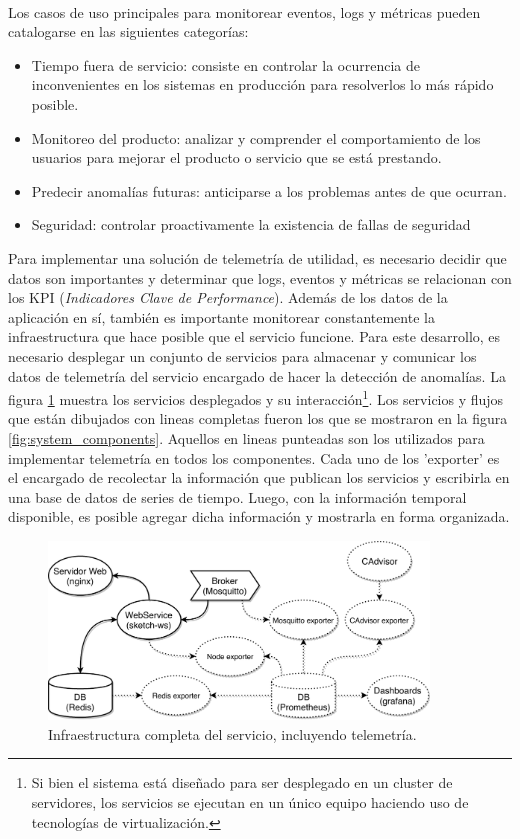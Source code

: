 \documentclass[a4paper,12pt, oneside]{article}
\begin{document}
\

Los casos de uso principales para monitorear eventos, logs y métricas pueden catalogarse en las siguientes categorías:
\begin{itemize}
	\item Tiempo fuera de servicio: consiste en controlar la ocurrencia de inconvenientes en los sistemas en producción para resolverlos lo más rápido posible.
	\item Monitoreo del producto: analizar y comprender el comportamiento de los usuarios para mejorar el producto o servicio que se está prestando.
	\item Predecir anomalías futuras: anticiparse a los problemas antes de que ocurran.
	\item Seguridad: controlar proactivamente la existencia de fallas de seguridad
\end{itemize}

Para implementar una solución de telemetría de utilidad, es necesario decidir que datos son importantes y determinar que logs, eventos y métricas se relacionan con los KPI (\textit{Indicadores Clave de Performance}). Además de los datos de la aplicación en sí, también es importante monitorear constantemente la infraestructura que hace posible que el servicio funcione. Para este desarrollo, es necesario desplegar un conjunto de servicios para almacenar y comunicar los datos de telemetría del servicio encargado de hacer la detección de anomalías. La figura \ref{diag:service_infrastructure} muestra los servicios desplegados y su interacción\footnote{Si bien el sistema está diseñado para ser desplegado en un cluster de servidores, los servicios se ejecutan en un único equipo haciendo uso de tecnologías de virtualización.}. Los servicios y flujos que están dibujados con lineas completas fueron los que se mostraron en la figura \ref{fig:system_components}. Aquellos en lineas punteadas son los utilizados para implementar telemetría en todos los componentes. Cada uno de los 'exporter' es el encargado de recolectar la información que publican los servicios y escribirla en una base de datos de series de tiempo. Luego, con la información temporal disponible, es posible agregar dicha información y mostrarla en forma organizada.

\begin{figure}[h]
	\centering
	\includegraphics[width=0.9\textwidth]{./graph/service_infrastructure.pdf}
	\caption{Infraestructura completa del servicio, incluyendo telemetría.}
	\label{diag:service_infrastructure}
\end{figure}
\end{document}
